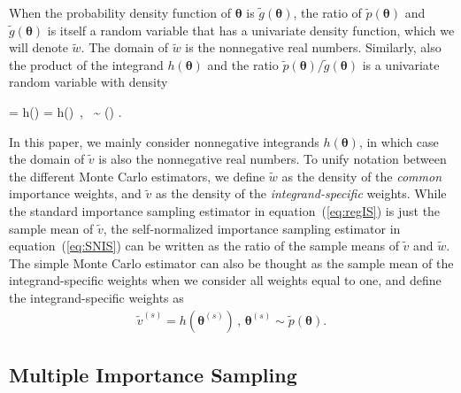 \documentclass[12pt]{article}
\newcommand{\ome}{v}
\newenvironment{nalign}{
    \begin{equation}
    \begin{aligned}
}{
    \end{aligned}
    \end{equation}
    \ignorespacesafterend
}
\newenvironment{nalign*}{
    \begin{equation*}
    \begin{aligned}
}{
    \end{aligned}
    \end{equation*}
    \ignorespacesafterend
}
\begin{document}
When the probability density function of $\boldsymbol{\theta}$ is $\widetilde{g} (\boldsymbol{\theta})$,
the ratio of $\widetilde{p}(\boldsymbol{\theta})$ and $\widetilde{g}(\boldsymbol{\theta})$
is itself a random variable that has a univariate density function, which we will denote $\widetilde{w}$.
The domain of $\widetilde{w}$ is the nonnegative real numbers.
Similarly, also the product of the integrand
$h (\boldsymbol{\theta})$
and the ratio $\widetilde{p}(\boldsymbol{\theta}) / \widetilde{g}(\boldsymbol{\theta})$
is a univariate random variable with density
\begin{nalign*}
\widetilde{\ome} =  h(\boldsymbol{\theta}) =  h(\boldsymbol{\theta})\, , \, \boldsymbol{\theta} \sim {} (\boldsymbol{\theta}) .
\end{nalign*}
In this paper, we mainly consider nonnegative integrands
$h (\boldsymbol{\theta})$, in which case the domain of $\widetilde{\ome}$ is also the nonnegative
real numbers.
To unify notation between the different Monte Carlo estimators, we define
$\widetilde{w}$ as the density of the \emph{common}
importance weights, and $\widetilde{\ome}$ as the density
of the \emph{integrand-specific} weights.
While the standard importance sampling estimator in equation~(\ref{eq:regIS})
is just the sample mean of $\widetilde{\ome}$,
the self-normalized importance sampling
estimator in equation~(\ref{eq:SNIS}) can be written as the ratio of the sample means of $\widetilde{\ome} $ and $\widetilde{w}$.
The simple Monte Carlo estimator can also be thought as the sample mean of the integrand-specific
weights when we consider all weights equal to one, and define the integrand-specific weights as
\begin{nalign} \label{eq:wfsmc}
\widetilde{\ome}^{(s)} =  h (\boldsymbol{\theta}^{(s)}) \, , \, \boldsymbol{\theta}^{(s)} \sim \widetilde{p} (\boldsymbol{\theta}) .
\end{nalign}




\subsection{Multiple Importance Sampling}
\end{document}
